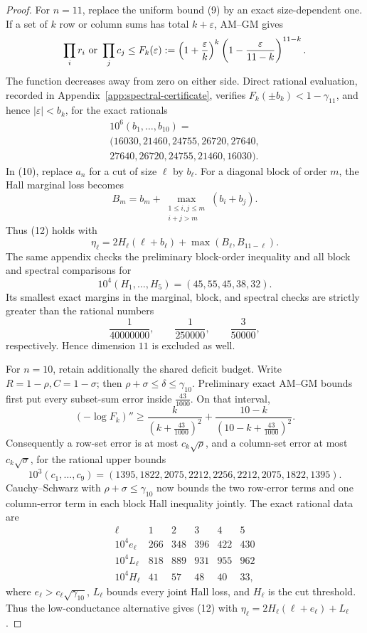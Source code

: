 \documentclass[10pt,a4paper]{amsart}
\theoremstyle{definition}
\theoremstyle{remark}
\newenvironment{exacttable}
  {\begingroup\small
   \setlength{\arraycolsep}{4pt}%
   \renewcommand{\arraystretch}{1.12}}
  {\endgroup}
\begin{document}
\begin{proof}
For \(n=11\), replace the uniform bound (9) by an exact size-dependent one.
If a set of \(k\) row or column sums has total \(k+\varepsilon\), AM--GM
gives
\[
\prod_i r_i\ \hbox{or}\ \prod_jc_j
\leq F_k(\varepsilon):=
\left(1+\frac{\varepsilon}{k}\right)^k
\left(1-\frac{\varepsilon}{11-k}\right)^{11-k}.
\]
The function decreases away from zero on either side.  Direct rational
evaluation, recorded in Appendix~\ref{app:spectral-certificate}, verifies
\(F_k(\pm b_k)<1-\gamma_{11}\), and hence
\(|\varepsilon|<b_k\), for the exact rationals
\[
\begin{gathered}
10^6(b_1,\ldots,b_{10})={}\\
(16030,21460,24755,26720,27640,\\
 27640,26720,24755,21460,16030).
\end{gathered}
\]
In (10), replace \(a_n\) for a cut of size \(\ell\) by \(b_\ell\). For a
diagonal block of order \(m\), the Hall marginal loss becomes
\[
B_m=b_m+\max_{\substack{1\leq i,j\leq m\\i+j>m}}(b_i+b_j).
\]
Thus (12) holds with
\[
\eta_\ell=2H_\ell(\ell+b_\ell)+\max(B_\ell,B_{11-\ell}).
\]
The same appendix checks the preliminary block-order inequality and all
block and spectral comparisons for
\[
10^4(H_1,\ldots,H_5)=(45,55,45,38,32).
\]
Its smallest exact margins in the marginal, block, and spectral checks are
strictly greater than the rational numbers
\[
\frac1{40000000},\qquad \frac1{250000},\qquad \frac3{50000},
\]
respectively. Hence dimension \(11\) is excluded as well.

For \(n=10\), retain additionally the shared deficit budget. Write
\(R=1-\rho,C=1-\sigma\); then
\(\rho+\sigma\leq\delta\leq\gamma_{10}\). Preliminary exact AM--GM bounds
first put every subset-sum error inside \(\frac{43}{1000}\). On that
interval,
\[
(-\log F_k)''\geq
\frac{k}{(k+\frac{43}{1000})^2}+
\frac{10-k}{(10-k+\frac{43}{1000})^2}.
\]
Consequently a row-set error is at most \(c_k\sqrt\rho\), and a column-set
error at most \(c_k\sqrt\sigma\), for the rational upper bounds
\[
10^3(c_1,\ldots,c_9)
=(1395,1822,2075,2212,2256,2212,2075,1822,1395).
\]
Cauchy--Schwarz with \(\rho+\sigma\leq\gamma_{10}\) now bounds the two
row-error terms and one column-error term in each block Hall inequality
jointly.  The exact rational data are
\begin{exacttable}
\[
\begin{array}{c|ccccc}
\ell&1&2&3&4&5\\\hline
10^4e_\ell&266&348&396&422&430\\
10^4L_\ell&818&889&931&955&962\\
10^4H_\ell&41&57&48&40&33 ,
\end{array}
\]
\end{exacttable}
where \(e_\ell>c_\ell\sqrt{\gamma_{10}}\), \(L_\ell\) bounds every joint
Hall loss, and \(H_\ell\) is the cut threshold. Thus the low-conductance
alternative gives (12) with
\(\eta_\ell=2H_\ell(\ell+e_\ell)+L_\ell\).


\end{proof}
\end{document}
